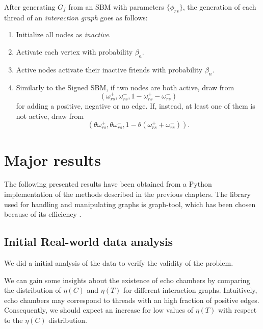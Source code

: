 \bigskip
After generating $G_f$ from an SBM with parameters $\{\phi_{rs} \}$, the
generation of each thread of an \emph{interaction graph} goes as
follows:

\begin{enumerate}
	\item Initialize all nodes as \emph{inactive}.
	\item Activate each vertex with probability $\beta_{a}  $.
	\item Active nodes activate their inactive friends with
	      probability $\beta_n$.
	\item Similarly to the Signed SBM, if two nodes are both active, draw
	      from
	      \begin{equation*}
		      (\omega _{rs} ^{+}, \omega _{rs} ^{-}, 1 - \omega _{rs} ^{+} -
		      \omega _{rs} ^{-})
	      \end{equation*}
	      for adding a positive, negative or no edge. If, instead, at least one
	      of them is not active, draw from
	      \begin{equation*}
		      (\theta \omega _{rs} ^{+}, \theta \omega _{rs} ^{-}, 1
		      - \theta (\omega _{rs} ^{+} + \omega _{rs} ^{-})).
	      \end{equation*}
\end{enumerate}

\section{Major results}

The following presented results have been obtained from a Python
implementation of the methods described in the previous chapters. The library used
for handling and manipulating graphs is graph-tool, which has been chosen
because of its efficiency \cite{peixoto_graph-tool_2014}.

\subsection{Initial Real-world data analysis}%
\label{sub:validity_problem_definition}

We did a initial analysis of the data to verify the validity of the problem.

We can gain some insights about the existence of echo chambers by comparing
the distribution of $\eta(C)$ and $\eta(T)$ for different interaction graphs.
Intuitively, echo chambers may correspond to threads with an
high fraction of positive edges. Consequently, we should expect an increase
for low values of $\eta(T)$ with respect to the $\eta(C)$ distribution.

